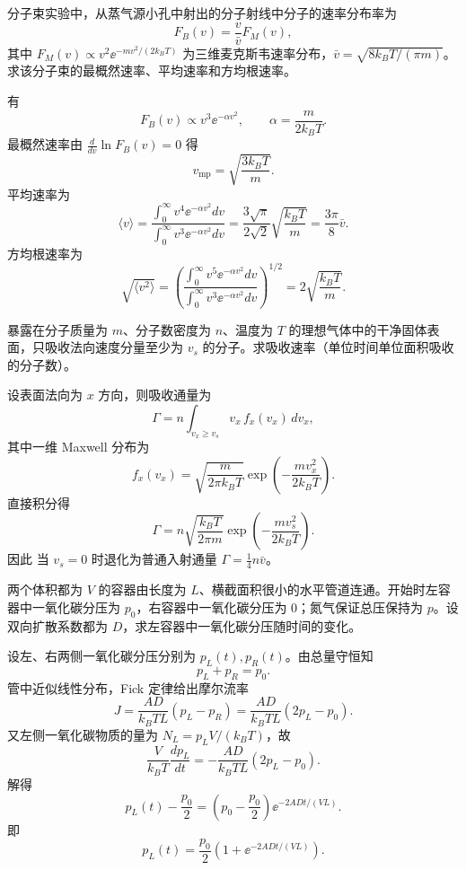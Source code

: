 \begin{question}
分子束实验中，从蒸气源小孔中射出的分子射线中分子的速率分布率为
\[
F_B(v)=\frac{v}{\bar v}F_M(v),
\]
其中 $F_M(v)\propto v^2 \ee^{-mv^2/(2k_BT)}$ 为三维麦克斯韦速率分布，$\bar v=\sqrt{8k_BT/(\pi m)}$。求该分子束的最概然速率、平均速率和方均根速率。
\begin{solution}
有
\[
F_B(v)\propto v^3\ee^{-\alpha v^2},\qquad \alpha=\frac{m}{2k_BT}.
\]
最概然速率由 $\frac{d}{dv}\ln F_B(v)=0$ 得
\[
v_{\mathrm{mp}}=\sqrt{\frac{3k_BT}{m}}.
\]
平均速率为
\[
\langle v\rangle=\frac{\int_0^{\infty}v^4\ee^{-\alpha v^2}dv}{\int_0^{\infty}v^3\ee^{-\alpha v^2}dv}
=\frac{3\sqrt\pi}{2\sqrt2}\sqrt{\frac{k_BT}{m}}
=\frac{3\pi}{8}\bar v.
\]
方均根速率为
\[
\sqrt{\langle v^2\rangle}=\left(\frac{\int_0^{\infty}v^5\ee^{-\alpha v^2}dv}{\int_0^{\infty}v^3\ee^{-\alpha v^2}dv}\right)^{1/2}
=2\sqrt{\frac{k_BT}{m}}.
\]
\end{solution}
\end{question}

\begin{question}
暴露在分子质量为 $m$、分子数密度为 $n$、温度为 $T$ 的理想气体中的干净固体表面，只吸收法向速度分量至少为 $v_s$ 的分子。求吸收速率（单位时间单位面积吸收的分子数）。
\begin{solution}
设表面法向为 $x$ 方向，则吸收通量为
\[
\Gamma=n\int_{v_x\ge v_s}v_x\,f_x(v_x)\,dv_x,
\]
其中一维 Maxwell 分布为
\[
f_x(v_x)=\sqrt{\frac{m}{2\pi k_BT}}\exp\!\left(-\frac{mv_x^2}{2k_BT}\right).
\]
直接积分得
\[
\Gamma=n\sqrt{\frac{k_BT}{2\pi m}}\exp\!\left(-\frac{mv_s^2}{2k_BT}\right).
\]
因此
当 $v_s=0$ 时退化为普通入射通量 $\Gamma=\frac14n\bar v$。
\end{solution}
\end{question}

\begin{question}
两个体积都为 $V$ 的容器由长度为 $L$、横截面积很小的水平管道连通。开始时左容器中一氧化碳分压为 $p_0$，右容器中一氧化碳分压为 $0$；氮气保证总压保持为 $p$。设双向扩散系数都为 $D$，求左容器中一氧化碳分压随时间的变化。
\begin{solution}
设左、右两侧一氧化碳分压分别为 $p_L(t),p_R(t)$。由总量守恒知
\[
p_L+p_R=p_0.
\]
管中近似线性分布，Fick 定律给出摩尔流率
\[
J=\frac{AD}{k_BT L}(p_L-p_R)=\frac{AD}{k_BT L}(2p_L-p_0).
\]
又左侧一氧化碳物质的量为 $N_L=p_LV/(k_BT)$，故
\[
\frac{V}{k_BT}\frac{dp_L}{dt}=-\frac{AD}{k_BT L}(2p_L-p_0).
\]
解得
\[
p_L(t)-\frac{p_0}{2}=\left(p_0-\frac{p_0}{2}\right)\ee^{-2ADt/(VL)}.
\]
即
\[
p_L(t)=\frac{p_0}{2}\left(1+\ee^{-2ADt/(VL)}\right).
\]
\end{solution}
\end{question}

